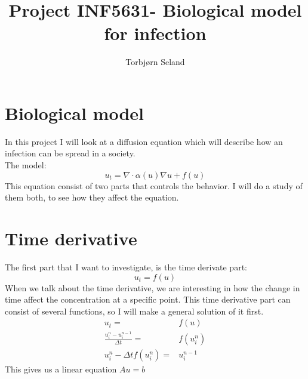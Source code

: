 \documentclass[norsk,11pt,a4paper]{article}
\begin{document}
\title{Project INF5631- Biological model for infection}
\author{Torbjørn Seland}
\maketitle

\section*{Biological model}
In this project I will look at a diffusion equation which will describe how an
infection can be spread in a society.
\\
The model:
\begin{equation}
u_t = \nabla \cdot \alpha(u)\nabla u + f(u)
\end{equation}
This equation consist of two parts that controls the behavior. I will do a study of them both, to 
see how they affect the equation.
\section*{Time derivative}
The first part that I want to investigate, is the time derivate part:
\begin{equation}
u_t = f(u)
\end{equation}
When we talk about the time derivative, we are interesting in how the change in
time affect the concentration at a specific point. This time derivative part can
consist of several functions, so I will make a general solution of it first.
\begin{align*}
u_t =& f(u)\\
\frac{u^n_i-u^{n-1}_i}{\Delta t}=& f(u^n_i)\\
u^n_i-\Delta t f(u^n_i) =& u^{n-1}_i
\end{align*}
This gives us a linear equation $Au = b$
\end{document}

